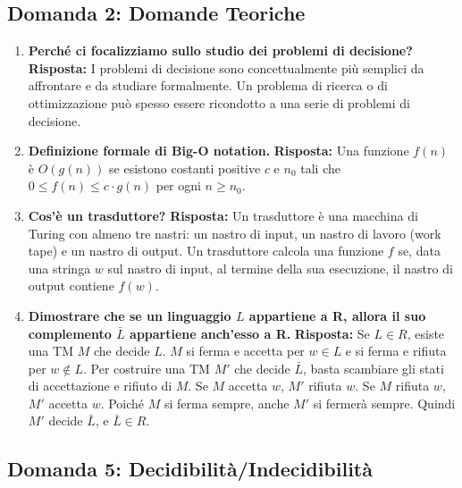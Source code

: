 \documentclass[a4paper]{article}
\theoremstyle{definition} %
\begin{document}
\subsection{Domanda 2: Domande Teoriche}
\begin{enumerate}[label=\Alph*]
    \item \textbf{Perché ci focalizziamo sullo studio dei problemi di decisione?}
    \textbf{Risposta:} I problemi di decisione sono concettualmente più semplici da affrontare e da studiare formalmente. Un problema di ricerca o di ottimizzazione può spesso essere ricondotto a una serie di problemi di decisione.

    \item \textbf{Definizione formale di Big-O notation.}
    \textbf{Risposta:} Una funzione $f(n)$ è $O(g(n))$ se esistono costanti positive $c$ e $n_0$ tali che $0 \le f(n) \le c \cdot g(n)$ per ogni $n \ge n_0$.

    \item \textbf{Cos'è un trasduttore?}
    \textbf{Risposta:} Un trasduttore è una macchina di Turing con almeno tre nastri: un nastro di input, un nastro di lavoro (work tape) e un nastro di output. Un trasduttore calcola una funzione $f$ se, data una stringa $w$ sul nastro di input, al termine della sua esecuzione, il nastro di output contiene $f(w)$.

    \item \textbf{Dimostrare che se un linguaggio $L$ appartiene a R, allora il suo complemento $\bar{L}$ appartiene anch'esso a R.}
    \textbf{Risposta:} Se $L \in R$, esiste una TM $M$ che decide $L$. $M$ si ferma e accetta per $w \in L$ e si ferma e rifiuta per $w \notin L$. Per costruire una TM $M'$ che decide $\bar{L}$, basta scambiare gli stati di accettazione e rifiuto di $M$. Se $M$ accetta $w$, $M'$ rifiuta $w$. Se $M$ rifiuta $w$, $M'$ accetta $w$. Poiché $M$ si ferma sempre, anche $M'$ si fermerà sempre. Quindi $M'$ decide $\bar{L}$, e $\bar{L} \in R$.
\end{enumerate}

\subsection{Domanda 5: Decidibilità/Indecidibilità}
\end{document}
